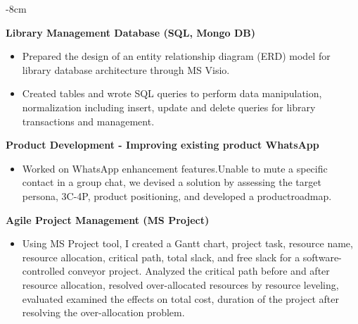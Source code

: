 \documentclass[10pt,a4paper]{altacv}
\begin{document}
  \tagline{  }


\begin{adjustwidth}{}{-8cm}
\makecvheader
\end{adjustwidth}

\textbf{Library Management Database (SQL, Mongo DB)}
\begin{itemize}
\item  Prepared the design of an entity relationship diagram (ERD) model for library database architecture through MS Visio.
\item  Created tables and wrote SQL queries to perform data manipulation, normalization including insert, update and delete queries for library transactions and management.
\end{itemize}
\divider

\textbf{ {Product Development - Improving existing product WhatsApp }}
\begin{itemize}
\item  Worked on WhatsApp enhancement features.Unable to mute a specific contact in a group chat, we devised a solution by assessing the target persona, 3C-4P, product positioning, and developed a productroadmap.
\end{itemize}
\divider

\textbf{{Agile Project Management (MS Project)}}
\begin{itemize}
\item  Using MS Project tool, I created a Gantt chart, project task, resource name, resource allocation, critical path, total slack, and free slack for a software-controlled conveyor project. Analyzed the critical path before and after resource allocation, resolved over-allocated resources by resource leveling, evaluated examined the effects on total cost, duration of the project after resolving the over-allocation problem.
\end{itemize}
\divider
 
\end{document}
